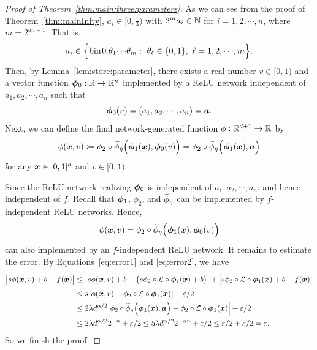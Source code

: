\documentclass[nohyperref]{article}
\theoremstyle{plain}
\theoremstyle{definition}
\theoremstyle{remark}
\begin{document}
\begin{proof}[Proof of Theorem~\ref{thm:main:three:parameters}]
	As we can see from the proof of Theorem~\ref{thm:mainInfty}, $a_i\in [0,\tfrac{1}{3})$ with $2^m a_i\in \N$ for $i=1,2,\cdots,n$, where $m=2^{dn+1}$. That is,
	\begin{equation*}
		a_i\in \Big\{\bin 0.\theta_1\cdots\theta_{m}:\  \theta_\ell\in \{0,1\},\  \ell=1,2,\cdots,m \Big\}.
	\end{equation*}
	Then, by Lemma~\ref{lem:store:parameter}, there exists a real number $v\in [0,1)$ and a vector function $\bmphi_0:\R\to\R^n$ implemented by a ReLU network independent of $a_1,a_2,\cdots,a_n$ such that
	\begin{equation*}
		\bmphi_0(v)=(a_1,a_2,\cdots,a_n)=\bma.
	\end{equation*}
	Next, we can define the final network-generated function $\phi:\R^{d+1}\to\R$ by
	\begin{equation*}
		\phi({\bm{x}},v)\coloneqq \phi_2\circ {\widetilde{\phi}}_\eta\Big({\bm{\phi}}_1({\bm{x}}),{\bm{\phi}}_0(v)\Big)
		=\phi_2\circ {\widetilde{\phi}}_\eta\Big({\bm{\phi}}_1({\bm{x}}),{\bm{a}}\Big)
	\end{equation*}
	for any ${\bm{x}}\in [0,1]^d$ and $v\in [0,1)$.
	
	Since the ReLU network realizing ${\bm{\phi}}_0$ is independent of $a_1,a_2,\cdots,a_n$, and hence independent of $f$. Recall that ${\bm{\phi}}_1$, $\phi_2$, and ${\widetilde{\phi}}_\eta$ can be implemented by $f$-independent ReLU networks. Hence,
	\begin{equation*}
		\phi({\bm{x}},v)= \phi_2\circ {\widetilde{\phi}}_\eta\Big({\bm{\phi}}_1({\bm{x}}),{\bm{\phi}}_0(v)\Big)
	\end{equation*}
	can also implemented by an $f$-independent ReLU network.
	It remains to estimate the error. By Equations~\eqref{eq:error1} and \eqref{eq:error2}, we have
	\begin{equation*}
		\begin{split}
			\big|s\phi({\bm{x}},v)+b-f({\bm{x}})\big|
			&\le 
			\Big|s\phi({\bm{x}},v)+b-\big(s\phi_2\circ{\mathcal{L}}\circ{\bm{\phi}}_1({\bm{x}})+b\big)\Big|  +   \Big|s\phi_2\circ{\mathcal{L}}\circ{\bm{\phi}}_1({\bm{x}})+b-f({\bm{x}})\Big| \\
			&\le s\big|\phi({\bm{x}},v)-\phi_2\circ{\mathcal{L}}\circ{\bm{\phi}}_1({\bm{x}})\big|  + \varepsilon/2\\
			&\le 2\lambda d^{\alpha/2}\Big|\phi_2\circ {\widetilde{\phi}}_\eta\Big({\bm{\phi}}_1({\bm{x}}),{\bm{a}}\Big)-\phi_2\circ{\mathcal{L}}\circ{\bm{\phi}}_1({\bm{x}})\Big|  + \varepsilon/2\\
			&\le 2\lambda d^{\alpha/2} 2^{-n} +\varepsilon/2\le
			5\lambda d^{\alpha/2} 2^{-\alpha  n} +\varepsilon/2\le\varepsilon/2 +\varepsilon/2=\varepsilon.
		\end{split}
	\end{equation*}
	So we finish the proof.
\end{proof}
\end{document}
